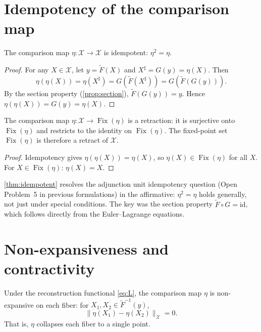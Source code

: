 \documentclass[12pt, oneside]{memoir}
\DeclareMathOperator{\Fix}{Fix}
\newcommand{\X}{\mathcal{X}}
\newcommand{\Ft}{\widetilde{F}}
\newcommand{\nnorm}[1]{\lVert #1 \rVert}
\begin{document}
\section{Idempotency of the comparison map}

\begin{theorem}
\label{thm:idempotent}
The comparison map $\eta: \X \to \X$ is idempotent: $\eta^2 = \eta$.
\end{theorem}

\begin{proof}
For any $X \in \X$, let $y = \Ft(X)$ and $X^\sharp = G(y) = \eta(X)$.  Then
\[
  \eta(\eta(X)) = \eta(X^\sharp) = G(\Ft(X^\sharp)) = G(\Ft(G(y))).
\]
By the section property (\cref{prop:section}), $\Ft(G(y)) = y$.  Hence $\eta(\eta(X)) =
G(y) = \eta(X)$.
\end{proof}

\begin{corollary}[Retraction of $\X$ onto $\Fix(\eta)$]
\label{cor:retraction}
The comparison map $\eta: \X \to \Fix(\eta)$ is a retraction: it is surjective onto
$\Fix(\eta)$ and restricts to the identity on $\Fix(\eta)$.  The fixed-point set
$\Fix(\eta)$ is therefore a retract of $\X$.
\end{corollary}

\begin{proof}
Idempotency gives $\eta(\eta(X)) = \eta(X)$, so $\eta(X) \in \Fix(\eta)$ for all
$X$.  For $X \in \Fix(\eta)$: $\eta(X) = X$.
\end{proof}

\cref{thm:idempotent} resolves the adjunction unit idempotency question (Open Problem~5
in previous formulations) in the affirmative: $\eta^2 = \eta$ holds generally, not just
under special conditions.  The key was the section property $\Ft \circ G = \mathrm{id}$,
which follows directly from the Euler--Lagrange equations.

\section{Non-expansiveness and contractivity}

\begin{proposition}
\label{prop:non-expansive}
Under the reconstruction functional \cref{eq:L}, the comparison map $\eta$ is
non-expansive on each fiber: for $X_1, X_2 \in \Ft^{-1}(y)$,
\[
  \nnorm{\eta(X_1) - \eta(X_2)}_\X = 0.
\]
That is, $\eta$ collapses each fiber to a single point.
\end{proposition}
\end{document}
